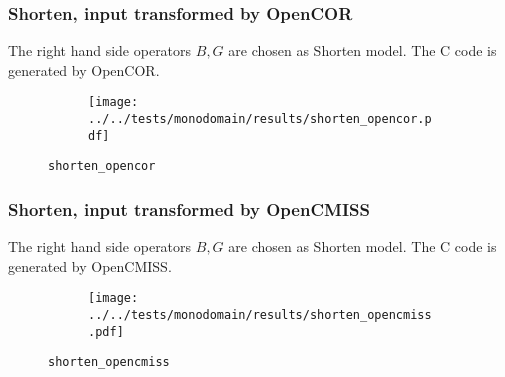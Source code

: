 %
%
%
%
%
\begin{frame}
  \frametitle{Shorten, input transformed by OpenCOR}
  The right hand side operators $B,G$ are chosen as Shorten model. The C code is generated by OpenCOR.
  \vspace*{-0.2cm}
  \begin{figure}[h!]
    \begin{subfigure}[t]{0.5\textwidth}%
    \centering
    \end{subfigure}
    \begin{subfigure}[t]{0.48\textwidth}%
      \centering%
      \texttt{[image: ../../tests/monodomain/results/shorten\_opencor.pdf]}%
    \end{subfigure}%
    \caption{\lstinline{shorten_opencor}}
  \end{figure} 
\end{frame}
%
%
\begin{frame}
  \frametitle{Shorten, input transformed by OpenCMISS}
  The right hand side operators $B,G$ are chosen as Shorten model. The C code is generated by OpenCMISS.
  \vspace*{-0.2cm}
  \begin{figure}[h!]
    \begin{subfigure}[t]{0.5\textwidth}%
    \centering
    \end{subfigure}
    \begin{subfigure}[t]{0.48\textwidth}%
      \centering%
      \texttt{[image: ../../tests/monodomain/results/shorten\_opencmiss.pdf]}%
    \end{subfigure}%
    \caption{\lstinline{shorten_opencmiss}}
  \end{figure} 
\end{frame}
